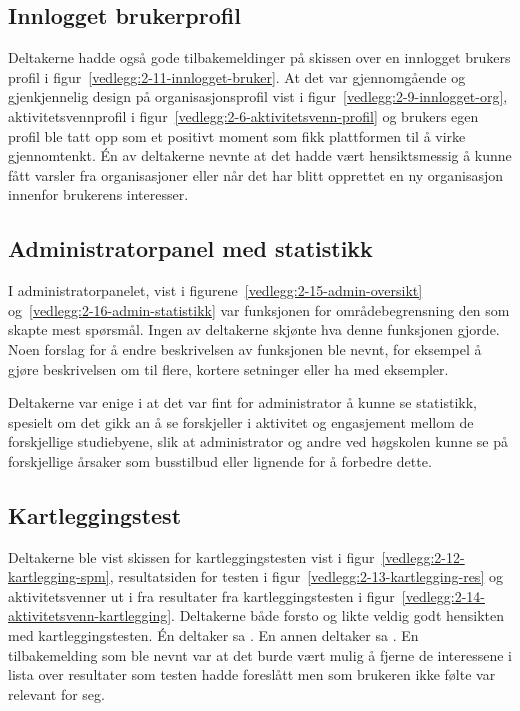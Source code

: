 \subsection{Innlogget brukerprofil}

Deltakerne hadde også gode tilbakemeldinger på skissen over en innlogget brukers profil i figur~\ref{vedlegg:2-11-innlogget-bruker}. At det var gjennomgående og gjenkjennelig design på organisasjonsprofil vist i figur~\ref{vedlegg:2-9-innlogget-org}, aktivitetsvennprofil i figur~\ref{vedlegg:2-6-aktivitetsvenn-profil} og brukers egen profil ble tatt opp som et positivt moment som fikk plattformen til å virke gjennomtenkt. Én av deltakerne nevnte at det hadde vært hensiktsmessig å kunne fått varsler fra organisasjoner eller når det har blitt opprettet en ny organisasjon innenfor brukerens interesser.


\subsection{Administratorpanel med statistikk}

I administratorpanelet, vist i figurene~\ref{vedlegg:2-15-admin-oversikt} og~\ref{vedlegg:2-16-admin-statistikk} var funksjonen for områdebegrensning den som skapte mest spørsmål. Ingen av deltakerne skjønte hva denne funksjonen gjorde. Noen forslag for å endre beskrivelsen av funksjonen ble nevnt, for eksempel å gjøre beskrivelsen om til flere, kortere setninger eller ha med eksempler.

Deltakerne var enige i at det var fint for administrator å kunne se statistikk, spesielt om det gikk an å se forskjeller i aktivitet og engasjement mellom de forskjellige studiebyene, slik at administrator og andre ved høgskolen kunne se på forskjellige årsaker som busstilbud eller lignende for å forbedre dette.


\subsection{Kartleggingstest}

Deltakerne ble vist skissen for kartleggingstesten vist i figur~\ref{vedlegg:2-12-kartlegging-spm}, resultatsiden for testen i figur~\ref{vedlegg:2-13-kartlegging-res} og aktivitetsvenner ut i fra resultater fra kartleggingstesten i figur~\ref{vedlegg:2-14-aktivitetsvenn-kartlegging}. Deltakerne både forsto og likte veldig godt hensikten med kartleggingstesten. Én deltaker sa . En annen deltaker sa . En tilbakemelding som ble nevnt var at det burde vært mulig å fjerne de interessene i lista over resultater som testen hadde foreslått men som brukeren ikke følte var relevant for seg.


